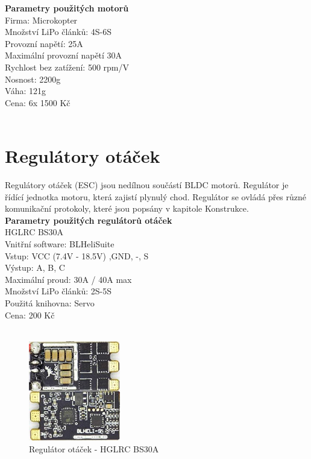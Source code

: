 \textbf{Parametry použitých motorů}\\
Firma: Microkopter\\
Množství LiPo článků: 4S-6S\\
Provozní napětí: 25A\\
Maximální provozní napětí 30A\\
Rychlost bez zatížení: 500 rpm/V\\
Nosnost: 2200g\\
Váha: 121g\\
Cena: 6x 1500 Kč\\
\cite{motor}\\

\section{Regulátory otáček} 
Regulátory otáček (ESC) jsou nedílnou součástí BLDC motorů. Regulátor je řídící jednotka motoru, která zajistí plynulý chod. Regulátor se ovládá přes různé komunikační protokoly, které jsou popsány v kapitole Konstrukce.\\

\textbf{Parametry použitých regulátorů otáček}\\
HGLRC BS30A\\
Vnitřní software: BLHeliSuite\\
Vstup: VCC (7.4V - 18.5V) ,GND, -, S\\
Výstup: A, B, C\\
Maximální proud: 30A / 40A max\\
Množství LiPo článků: 2S-5S\\
Použitá knihovna: Servo\\
Cena: 200 Kč\\
\cite{esc}\\

\begin{figure}[H]
	\centering
	\includegraphics[width=4cm]{pictures/esc.jpg}
	\caption{Regulátor otáček - HGLRC BS30A}
\end{figure}

